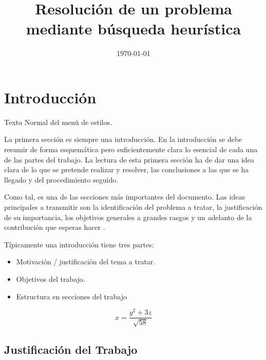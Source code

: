 \documentclass[12pt,a4paper]{articuloAPA}
\title{Resolución de un problema mediante búsqueda heurística}
\date{\today}
\begin{document}
\maketitle

\tableofcontents
\pagebreak

\section{Introducción}

Texto Normal del menú de estilos.

La primera sección es siempre una introducción. En la introducción se debe resumir de forma esquemática pero suficientemente clara lo esencial de cada una de las partes del trabajo. La lectura de esta primera sección ha de dar una idea clara de lo que se pretende realizar y resolver, las conclusiones a las que se ha llegado y del procedimiento seguido.

Como tal, es una de las secciones más importantes del documento. Las ideas principales a transmitir son la identificación del problema a tratar, la justificación de su importancia, los objetivos generales a grandes rasgos y un adelanto de la contribución que esperas hacer \parencite{rialland2021}.

Típicamente una introducción tiene tres partes:

\begin{itemize}
  \item Motivación / justificación del tema a tratar.
  \item Objetivos del trabajo.
  \item Estructura en secciones del trabajo
\end{itemize}


$$
x = \frac{y^2 + 3z}{\sqrt{58}}
$$


\subsection{Justificación del Trabajo}
\end{document}
